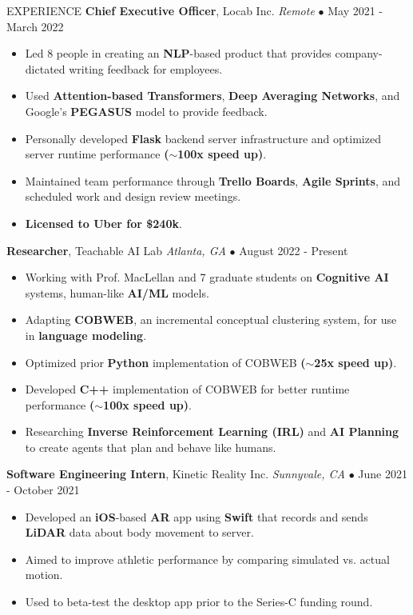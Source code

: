 \documentclass{resume} %
\begin{document}
\begin{rSection}{EXPERIENCE}
\vspace{-1mm}
\textbf{Chief Executive Officer}, Locab Inc. \hfill \textit{Remote} $\bullet$ May 2021 - March 2022
\vspace{-2mm}
\begin{itemize}
    \itemsep -6pt {} 
     \item Led 8 people in creating an \textbf{NLP}-based product that provides company-dictated writing feedback for employees.
     \item Used \textbf{Attention-based Transformers}, \textbf{Deep Averaging Networks}, and Google's \textbf{PEGASUS} model to provide feedback.
     \item Personally developed \textbf{Flask} backend server infrastructure and optimized server runtime performance \textbf{(\(\sim \)100x speed up)}.
     \item Maintained team performance through \textbf{Trello Boards}, \textbf{Agile Sprints}, and scheduled work and design review meetings.
     \item \textbf{Licensed to Uber for \$240k}.
\end{itemize}
\vspace{-1mm}
\textbf{Researcher}, Teachable AI Lab \hfill \textit{Atlanta, GA} $\bullet$ August 2022 - Present
\vspace{-2mm}
\begin{itemize}
    \itemsep -6pt {} 
     \item Working with Prof. MacLellan and 7 graduate students on \textbf{Cognitive AI} systems, human-like \textbf{AI/ML} models.
     \item Adapting \textbf{COBWEB}, an incremental conceptual clustering system, for use in \textbf{language modeling}.
     \item Optimized prior \textbf{Python} implementation of COBWEB \textbf{(\(\sim \)25x speed up)}.
     \item Developed \textbf{C++} implementation of COBWEB for better runtime performance \textbf{(\(\sim \)100x speed up)}.
     \item Researching \textbf{Inverse Reinforcement Learning (IRL)} and \textbf{AI Planning} to create agents that plan and behave like humans.
\end{itemize}
\vspace{-1mm}
\textbf{Software Engineering Intern}, Kinetic Reality Inc. \hfill \textit{Sunnyvale, CA} $\bullet$ June 2021 - October 2021
\vspace{-2mm}
\begin{itemize}
    \itemsep -6pt {} 
     \item Developed an \textbf{iOS}-based \textbf{AR} app using \textbf{Swift} that records and sends \textbf{LiDAR} data about body movement to server.
     \item Aimed to improve athletic performance by comparing simulated vs. actual motion.
     \item Used to beta-test the desktop app prior to the Series-C funding round.
\end{itemize}

\end{rSection} 
\end{document}
